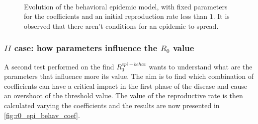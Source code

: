 \begin{figure}[h]
	\centering
	 \quad
	 \\
	\caption[Epidemic behavioral model $R_0$]{Evolution of the behavioral epidemic model, with fixed parameters for the coefficients and an initial reproduction rate less than $1$. It is observed that there aren't conditions for an epidemic to spread.}
	\label{fig:infected00_epi_behav}
\end{figure}

\subsubsection{$II$ case: how parameters influence the $R_0$ value}

A second test performed on the find $R_0^{epi-behav}$ wants to understand what are the parameters that influence more its value. The aim is to find which combination of coefficients can have a critical impact in the first phase of the disease and cause an overshoot of the threshold value. The value of the reproductive rate is then calculated varying the coefficients and the results are now presented in \ref{fig:r0_epi_behav_coef}. 

